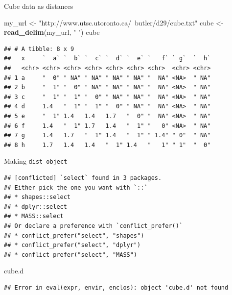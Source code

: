 \documentclass[ignorenonframetext,]{beamer}
\newenvironment{Shaded}{\begin{snugshade}}{\end{snugshade}}
\newcommand{\DecValTok}[1]{\textcolor[rgb]{0.00,0.00,0.81}{#1}}
\newcommand{\KeywordTok}[1]{\textcolor[rgb]{0.13,0.29,0.53}{\textbf{#1}}}
\newcommand{\NormalTok}[1]{#1}
\newcommand{\OperatorTok}[1]{\textcolor[rgb]{0.81,0.36,0.00}{\textbf{#1}}}
\newcommand{\StringTok}[1]{\textcolor[rgb]{0.31,0.60,0.02}{#1}}
\begin{document}
\begin{frame}[fragile]{Cube data as distances}
\protect\hypertarget{cube-data-as-distances}{}

\begin{Shaded}
\begin{Highlighting}[]
\NormalTok{my_url <-}\StringTok{ "http://www.utsc.utoronto.ca/~butler/d29/cube.txt"}
\NormalTok{cube <-}\StringTok{ }\KeywordTok{read_delim}\NormalTok{(my_url, }\StringTok{" "}\NormalTok{)}
\NormalTok{cube}
\end{Highlighting}
\end{Shaded}

\begin{verbatim}
## # A tibble: 8 x 9
##   x     `  a` `  b` `  c` `  d` `  e` `   f` ` g`  `  h`
##   <chr> <chr> <chr> <chr> <chr> <chr> <chr>  <chr> <chr>
## 1 a     "  0" " NA" " NA" " NA" " NA" "  NA" <NA>  " NA"
## 2 b     "  1" "  0" " NA" " NA" " NA" "  NA" <NA>  " NA"
## 3 c     "  1" "  1" "  0" " NA" " NA" "  NA" <NA>  " NA"
## 4 d     1.4   "  1" "  1" "  0" " NA" "  NA" <NA>  " NA"
## 5 e     "  1" 1.4   1.4   1.7   "  0" "  NA" <NA>  " NA"
## 6 f     1.4   "  1" 1.7   1.4   "  1" "   0" <NA>  " NA"
## 7 g     1.4   1.7   "  1" 1.4   "  1" " 1.4" " 0"  " NA"
## 8 h     1.7   1.4   1.4   "  1" 1.4   "   1" " 1"  "  0"
\end{verbatim}

\end{frame}

\begin{frame}[fragile]{Making \texttt{dist\ object}}
\protect\hypertarget{making-dist-object}{}

\begin{Shaded}
\end{Shaded}

\begin{verbatim}
## [conflicted] `select` found in 3 packages.
## Either pick the one you want with `::` 
## * shapes::select
## * dplyr::select
## * MASS::select
## Or declare a preference with `conflict_prefer()`
## * conflict_prefer("select", "shapes")
## * conflict_prefer("select", "dplyr")
## * conflict_prefer("select", "MASS")
\end{verbatim}

\begin{Shaded}
\begin{Highlighting}[]
\NormalTok{cube.d}
\end{Highlighting}
\end{Shaded}

\begin{verbatim}
## Error in eval(expr, envir, enclos): object 'cube.d' not found
\end{verbatim}

\end{frame}
\end{document}

